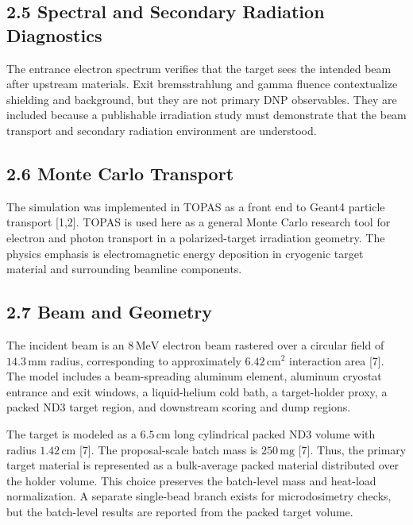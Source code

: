 \documentclass[
  12pt,
]{article}
\begin{document}
\hypertarget{spectral-and-secondary-radiation-diagnostics}{%
\subsection{2.5 Spectral and Secondary Radiation
Diagnostics}\label{spectral-and-secondary-radiation-diagnostics}}

The entrance electron spectrum verifies that the target sees the
intended beam after upstream materials. Exit bremsstrahlung and gamma
fluence contextualize shielding and background, but they are not primary
DNP observables. They are included because a publishable irradiation
study must demonstrate that the beam transport and secondary radiation
environment are understood.

\hypertarget{monte-carlo-transport}{%
\subsection{2.6 Monte Carlo Transport}\label{monte-carlo-transport}}

The simulation was implemented in TOPAS as a front end to Geant4
particle transport {[}1,2{]}. TOPAS is used here as a general Monte
Carlo research tool for electron and photon transport in a
polarized-target irradiation geometry. The physics emphasis is
electromagnetic energy deposition in cryogenic target material and
surrounding beamline components.

\hypertarget{beam-and-geometry}{%
\subsection{2.7 Beam and Geometry}\label{beam-and-geometry}}

The incident beam is an \(8\,\mathrm{MeV}\) electron beam rastered over
a circular field of \(14.3\,\mathrm{mm}\) radius, corresponding to
approximately \(6.42\,\mathrm{cm}^{2}\) interaction area {[}7{]}. The
model includes a beam-spreading aluminum element, aluminum cryostat
entrance and exit windows, a liquid-helium cold bath, a target-holder
proxy, a packed ND3 target region, and downstream scoring and dump
regions.

The target is modeled as a \(6.5\,\mathrm{cm}\) long cylindrical packed
ND3 volume with radius \(1.42\,\mathrm{cm}\) {[}7{]}. The proposal-scale
batch mass is \(250\,\mathrm{mg}\) {[}7{]}. Thus, the primary target
material is represented as a bulk-average packed material distributed
over the holder volume. This choice preserves the batch-level mass and
heat-load normalization. A separate single-bead branch exists for
microdosimetry checks, but the batch-level results are reported from the
packed target volume.
\end{document}
